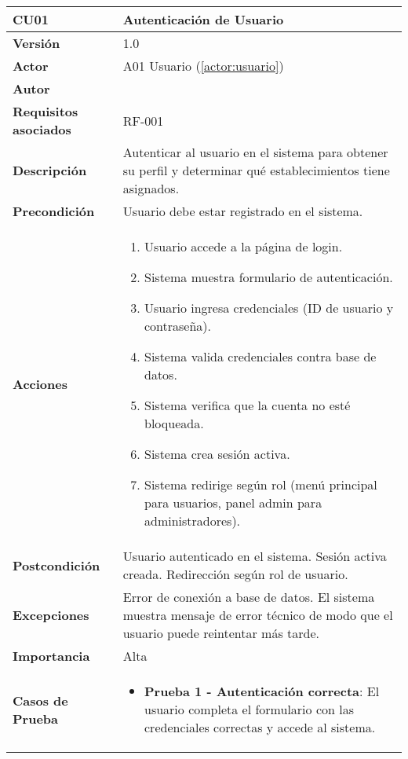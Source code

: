 \begin{table}[H]
	\centering
	\begin{tabularx}{\linewidth}{ p{} p{} }
		\toprule
		\textbf{CU01}    & \textbf{Autenticación de Usuario} \\
		\toprule
		\textbf{Versión}              & 1.0    \\
		\textbf{Actor}                & A01 Usuario (\ref{actor:usuario}) \\
		\textbf{Autor}                & \nombre \\
		\textbf{Requisitos asociados} & RF-001 \\
		\textbf{Descripción}          & Autenticar al usuario en el sistema para obtener su perfil y determinar qué establecimientos tiene asignados. \\
		\textbf{Precondición}         & Usuario debe estar registrado en el sistema. \\
		\textbf{Acciones}             &
		\begin{enumerate}
			\def\labelenumi{\arabic{enumi}.}
			\tightlist
			\item Usuario accede a la página de login.
            \item Sistema muestra formulario de autenticación.
            \item Usuario ingresa credenciales (ID de usuario y contraseña).
            \item Sistema valida credenciales contra base de datos.
            \item Sistema verifica que la cuenta no esté bloqueada.
            \item Sistema crea sesión activa.
            \item Sistema redirige según rol (menú principal para usuarios, panel admin para administradores).
		\end{enumerate}\\
		\textbf{Postcondición}        & Usuario autenticado en el sistema. Sesión activa creada. Redirección según rol de usuario.\\
		\textbf{Excepciones}          & Error de conexión a base de datos. El sistema muestra mensaje de error técnico de modo que el usuario puede reintentar más tarde.\\
		\textbf{Importancia}          & Alta \\
		\textbf{Casos de Prueba}      &
		\begin{itemize}
			\item \textbf{Prueba 1 - Autenticación correcta}: El usuario completa el formulario con las credenciales correctas y accede al sistema.

\end{itemize}
\end{tabularx}
\end{table}
